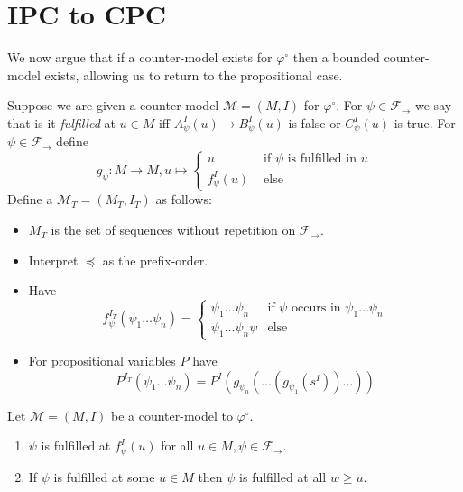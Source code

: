 \documentclass[a4paper,UKenglish,cleveref, autoref, thm-restate]{lipics-v2021}
\begin{document}
\section{IPC to CPC}

We now argue that if a counter-model exists for $\varphi^\circ$ then a bounded counter-model exists, allowing us to return to the propositional case.

\begin{definition}
	Suppose we are given a counter-model $\mathcal M = (M, I)$ for $\varphi^\circ$. For $\psi\in\mathcal F_\to$ we say that is it \textit{fulfilled} at $u\in M$ iff $A_\psi^I(u)\to B_\psi^I(u)$ is false or $C_\psi^I(u)$ is true. For $\psi\in\mathcal F_\to$ define $$g_\psi : M\to M, u\mapsto\begin{cases}
		u&\text{ if $\psi$ is fulfilled in $u$}\\
		f^I_\psi(u)&\text{ else}		
	\end{cases}$$Define a $\mathcal M_T = (M_T, I_T)$ as follows:
	\begin{itemize}
		\item $M_T$ is the set of sequences without repetition on $\mathcal F_\to$.
		\item Interpret $\preceq$ as the prefix-order.
		\item Have $$f_\psi^{I_T}(\psi_1\dots\psi_n) = \begin{cases}
			\psi_1\dots\psi_n&\text{if $\psi$ occurs in $\psi_1\dots\psi_n$}\\
			\psi_1\dots\psi_n\psi&\text{else}			
		\end{cases}$$
		\item For propositional variables $P$ have $$P^{I_T}(\psi_1\dots \psi_n) = P^I(g_{\psi_n}(\dots(g_{\psi_1}(s^I))\dots))$$
	\end{itemize}
\end{definition}
\begin{lemma}
	Let $\mathcal M = (M, I)$ be a counter-model to $\mathcal \varphi^\circ$.
	\begin{enumerate}
		\item $\psi$ is fulfilled at $f_\psi^I(u)$ for all $u\in M, \psi\in\mathcal F_\to$.
		\item If $\psi$ is fulfilled at some $u\in M$ then $\psi$ is fulfilled at all $w\geq u$.
	\end{enumerate}
	
\end{lemma}
\end{document}
